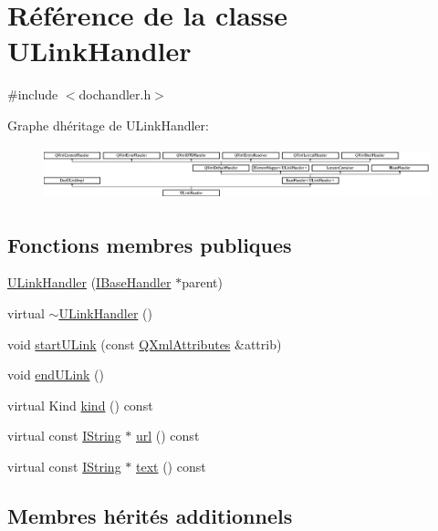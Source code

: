 \hypertarget{class_u_link_handler}{}\section{Référence de la classe U\+Link\+Handler}
\label{class_u_link_handler}


{\ttfamily \#include $<$dochandler.\+h$>$}

Graphe d\textquotesingle{}héritage de U\+Link\+Handler\+:\begin{figure}[H]
\begin{center}
\leavevmode
\includegraphics[height=1.538461cm]{class_u_link_handler}
\end{center}
\end{figure}
\subsection*{Fonctions membres publiques}
\begin{DoxyCompactItemize}
\item 
\hyperlink{class_u_link_handler_ae3f3c61e138f689d647b2e5575956ff8}{U\+Link\+Handler} (\hyperlink{class_i_base_handler}{I\+Base\+Handler} $\ast$parent)
\item 
virtual \hyperlink{class_u_link_handler_a914fe87cbc351d9447e8771dc8f1f117}{$\sim$\+U\+Link\+Handler} ()
\item 
void \hyperlink{class_u_link_handler_a401dcabd62c09b839e47f852dd27b115}{start\+U\+Link} (const \hyperlink{class_q_xml_attributes}{Q\+Xml\+Attributes} \&attrib)
\item 
void \hyperlink{class_u_link_handler_a6dd2187cc14ef7f176e7d4bce34f0f74}{end\+U\+Link} ()
\item 
virtual Kind \hyperlink{class_u_link_handler_aadb89f5f726d3283d2e6c50ed2c7bad3}{kind} () const 
\item 
virtual const \hyperlink{class_i_string}{I\+String} $\ast$ \hyperlink{class_u_link_handler_af04c9f00ebae2569ff14c862c4d80676}{url} () const 
\item 
virtual const \hyperlink{class_i_string}{I\+String} $\ast$ \hyperlink{class_u_link_handler_a6c311fa5a1bd04aa393c000f9acc77bd}{text} () const 
\end{DoxyCompactItemize}
\subsection*{Membres hérités additionnels}


